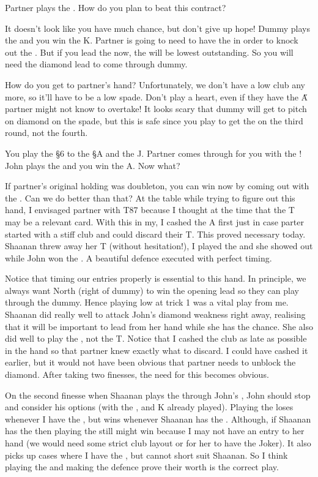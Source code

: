 \documentclass[a4paper]{JoshCards}
\begin{document}
Partner plays the . How do you plan to beat this contract?

It doesn't look like you have much chance, but don't give up hope! Dummy plays the  and you win the \D K. Partner is going to need to have the  in order to knock out the . But if you lead the  now, the  will be lowest outstanding. So you will need the diamond lead to come through dummy.

How do you get to partner's hand? Unfortunately, we don't have a low club any more, so it'll have to be a low spade. Don't play a heart, even if they have the \H A partner might not know to overtake! It looks scary that dummy will get to pitch on diamond on the spade, but this is safe since you play to get the on the third round, not the fourth.

You play the \S 6 to the \S A and the \D J. Partner comes through for you with the ! John plays the  and you win the \D A. Now what?

If partner's original holding was  doubleton, you can win now by coming out with the . Can we do better than that? At the table while trying to figure out this hand, I envisaged partner with \D T87 because I thought at the time that the \D T may be a relevant card. With this in my, I cashed the \C A first just in case parter started with a stiff club and could discard their \D T. This proved necessary today. Shaanan threw away her \D T (without hesitation!), I played the  and she showed out while John won the . A beautiful defence executed with perfect timing.

Notice that timing our entries properly is essential to this hand. In principle, we always want North (right of dummy) to win the opening lead so they can play through the dummy. Hence playing low at trick 1 was a vital play from me. Shaanan did really well to attack John's diamond weakness right away, realising that it will be important to lead from her hand while she has the chance. She also did well to play the , not the \D T. Notice that I cashed the club as late as possible in the hand so that partner knew exactly what to discard. I could have cashed it earlier, but it would not have been obvious that partner needs to unblock the diamond. After taking two finesses, the need for this becomes obvious.

On the second finesse when Shaanan plays the  through John's , John should stop and consider his options (with the ,  and \D K already played). Playing the  loses whenever I have the , but wins whenever Shaanan has the . Although, if Shaanan has the  then playing the  still might win because I may not have an entry to her hand (we would need some strict club layout or for her to have the Joker). It also picks up cases where I have the , but cannot short suit Shaanan. So I think playing the  and making the defence prove their worth is the correct play.
\end{document}
